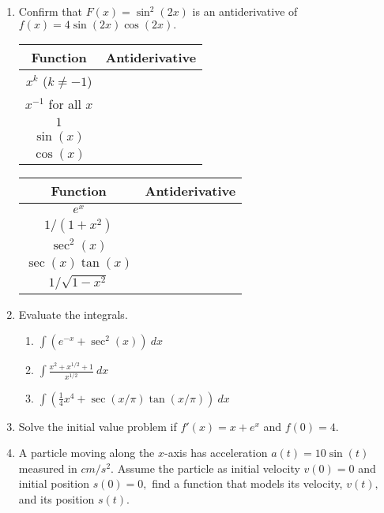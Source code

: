 \documentclass[11pt,fleqn]{article}
\def\ds{\displaystyle}
\begin{document}
\begin{enumerate}
\item Confirm that $F(x)=\sin^2(2x)$ is an antiderivative of $f(x)=4\sin(2x)\cos(2x).$
\vfill
\doublespacing
\begin{tabular}{|c|c|}\hline
Function & \quad \quad Antiderivative \quad \quad \quad \\ \hline
$\ds x^k$ ($k\neq -1$) &\\  \hline
$\ds x^{-1}$ for all $x$&\\ \hline
$\ds 1$ &\\ \hline
$\ds \sin(x)$ & \\ \hline
$\ds \cos(x)$ &\\ \hline
\end{tabular}
\quad
\begin{tabular}{|c|c|}\hline
Function & \quad \quad Antiderivative \quad \quad \quad \\ \hline
$\ds e^x$ &\\ \hline
$\ds 1/(1+x^2)$  &\\ \hline
$\ds \sec^2(x)$ &\\ \hline
$\ds \sec(x)\tan(x)$ &\\ \hline
$\ds 1/\sqrt{1-x^2}$ &\\ \hline
\end{tabular}
\singlespacing
\newpage
\item Evaluate the integrals.
	\begin{enumerate}
	\item $\displaystyle{\int( e^{-x} + \sec^2(x))\: dx}$\\
	\item $\displaystyle{\int \frac{x^2+x^{1/2}+1}{x^{1/2}}\: dx}$
	\vspace{.5in}
	\item $\displaystyle{\int (\frac{1}{4}x^4+\sec(x/\pi)\tan(x/\pi))\: dx}$
	\vspace{.5in}
	\end{enumerate}

\item Solve the initial value problem if $f'(x)=x+e^x$ and $f(0)=4.$
\vfill
\item A particle moving along the $x$-axis has acceleration $a(t)=10\sin(t)$ measured in $cm/s^2.$ Assume the particle as initial velocity $v(0)=0$ and initial position $s(0)=0,$ find a function that models its velocity, $v(t),$ and its position $s(t).$
\vfill
\end{enumerate}
\end{document}
